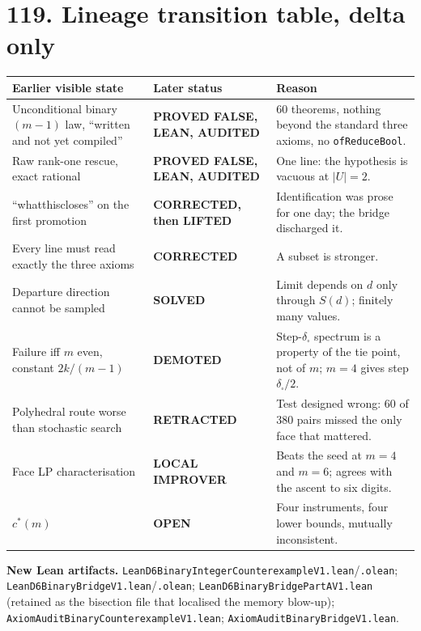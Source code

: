 \documentclass[9pt,twocolumn]{article}
\renewcommand{\_}{\CIGunderscore\allowbreak}
\begin{document}
\section*{119. Lineage transition table, delta only}
\begin{center}\scriptsize
\begin{tabularx}{0.98\columnwidth}{>{\raggedright\arraybackslash}p{}>{\raggedright\arraybackslash}p{}X}
\toprule
Earlier visible state & Later status & Reason\\
\midrule
Unconditional binary $(m-1)$ law, ``written and not yet compiled'' & \textbf{PROVED FALSE, LEAN, AUDITED} & 60 theorems, nothing beyond the standard three axioms, no \texttt{ofReduceBool}.\\
Raw rank-one rescue, exact rational & \textbf{PROVED FALSE, LEAN, AUDITED} & One line: the hypothesis is vacuous at $|U|=2$.\\
``what\_this\_closes'' on the first promotion & \textbf{CORRECTED, then LIFTED} & Identification was prose for one day; the bridge discharged it.\\
Every line must read exactly the three axioms & \textbf{CORRECTED} & A subset is stronger.\\
Departure direction cannot be sampled & \textbf{SOLVED} & Limit depends on $d$ only through $S(d)$; finitely many values.\\
Failure iff $m$ even, constant $2k/(m-1)$ & \textbf{DEMOTED} & Step-$\delta_\square$ spectrum is a property of the tie point, not of $m$; $m=4$ gives step $\delta_\square/2$.\\
Polyhedral route worse than stochastic search & \textbf{RETRACTED} & Test designed wrong: $60$ of $380$ pairs missed the only face that mattered.\\
Face LP characterisation & \textbf{LOCAL IMPROVER} & Beats the seed at $m=4$ and $m=6$; agrees with the ascent to six digits.\\
$c^\ast(m)$ & \textbf{OPEN} & Four instruments, four lower bounds, mutually inconsistent.\\
\bottomrule
\end{tabularx}
\end{center}

\textbf{New Lean artifacts.} \texttt{LeanD6BinaryIntegerCounter\-exampleV1.lean}\slash\allowbreak\texttt{.olean}; \texttt{LeanD6BinaryBridgeV1.lean}\slash\allowbreak\texttt{.olean}; \texttt{LeanD6BinaryBridgePart\-AV1.lean} (retained as the bisection file that localised the memory blow-up); \texttt{AxiomAuditBinaryCounter\-exampleV1.lean}; \texttt{AxiomAuditBinaryBridgeV1.lean}.
\end{document}
